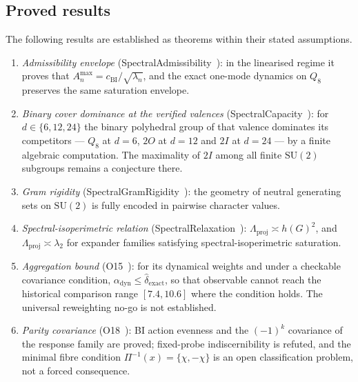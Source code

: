 \documentclass[11pt,a4paper]{article}
\theoremstyle{definition}
\newcommand{\SU}{\mathrm{SU}}
\newcommand{\cchi}{c_{\mathrm{BI}}}
\begin{document}
    \subsection{Proved results}
      \label{sec:proved}

      The following results are established as theorems within their stated assumptions.

      \begin{enumerate}
        \item \textit{Admissibility envelope} (SpectralAdmissibility~\cite{Beau2026a1}):
        in the linearised regime it proves that
        $A_n^{\max}=\cchi/\sqrt{\lambda_n}$, and the exact one-mode dynamics on $Q_8$ preserves
        the same saturation envelope.

        \item \textit{Binary cover dominance at the verified valences}
        (SpectralCapacity~\cite{Beau2026a2}): for $d \in \{6, 12, 24\}$ the binary polyhedral
        group of that valence dominates its competitors --- $Q_8$ at $d = 6$, $2O$ at $d = 12$ and
        $2I$ at $d = 24$ --- by a finite algebraic computation.
        The maximality of $2I$ among all finite $\SU(2)$ subgroups remains a conjecture there.

        \item \textit{Gram rigidity} (SpectralGramRigidity~\cite{Beau2026a3}): the geometry of
        neutral generating sets on $\SU(2)$ is fully encoded in pairwise character values.

        \item \textit{Spectral-isoperimetric relation}
        (SpectralRelaxation~\cite{Beau2026a5}):
        $\Lambda_{\mathrm{proj}} \asymp h(G)^2$, and
        $\Lambda_{\mathrm{proj}} \asymp \lambda_2$ for expander families satisfying
        spectral-isoperimetric saturation.

        \item \textit{Aggregation bound} (O15~\cite{Beau2026a19}): for its dynamical weights and
        under a checkable covariance condition, $\alpha_{\mathrm{dyn}} \leq
        \hat\delta_{\mathrm{exact}}$, so that observable cannot reach the historical comparison range
        $[7.4, 10.6]$ where the
        condition holds.
        The universal reweighting no-go is not established.

        \item \textit{Parity covariance} (O18~\cite{Beau2026a22}): BI action evenness and
        the $(-1)^{k}$ covariance of the response family are proved; fixed-probe
        indiscernibility is refuted, and the
        minimal fibre condition $\Pi^{-1}(x) = \{\chi, -\chi\}$ is an open classification
        problem, not a forced consequence.


\end{enumerate}
\end{document}
